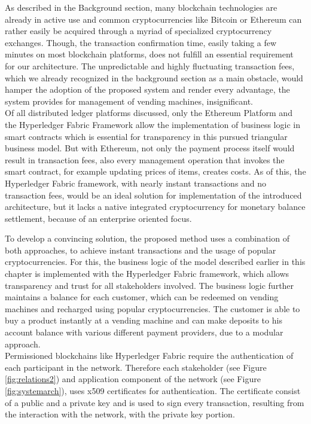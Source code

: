 As described in the Background section, many blockchain technologies are already in active use and common cryptocurrencies like Bitcoin or Ethereum can rather easily be acquired through a myriad of specialized cryptocurrency exchanges. Though, the transaction confirmation time, easily taking a few minutes on most blockchain platforms, does not fulfill an essential requirement for our architecture. The unpredictable and highly fluctuating transaction fees, which we already recognized in the background section as a main obstacle, would hamper the adoption of the proposed system and render every advantage, the system provides for management of vending machines, insignificant. \\
Of all distributed ledger platforms discussed, only the Ethereum Platform and the Hyperledger Fabric Framework allow the implementation of business logic in smart contracts which is essential for transparency in this pursued triangular business model. But with Ethereum, not only the payment process itself would result in transaction fees, also every management operation that invokes the smart contract, for example updating prices of items, creates costs. As of this, the Hyperledger Fabric framework, with nearly instant transactions and no transaction fees, would be an ideal solution for implementation of the introduced architecture, but it lacks a native integrated cryptocurrency for monetary balance settlement, because of an enterprise oriented focus.

To develop a convincing solution, the proposed method uses a combination of both approaches, to achieve instant transactions and the usage of popular cryptocurrencies. For this, the business logic of the model described earlier in this chapter is implemented with the Hyperledger Fabric framework, which allows transparency and trust for all stakeholders involved. The business logic further maintains a balance for each customer, which can be redeemed on vending machines and recharged using popular cryptocurrencies. The customer is able to buy a product instantly at a vending machine and can make deposits to his account balance with various different payment providers, due to a modular approach. \\
Permissioned blockchains like Hyperledger Fabric require the authentication of each participant in the network. Therefore each stakeholder (see Figure \ref{fig:relations2}) and application component of the network (see Figure \ref{fig:systemarch}), uses x509 certificates for authentication. The certificate consist of a public and a private key and is used to sign every transaction, resulting from the interaction with the network, with the private key portion.


